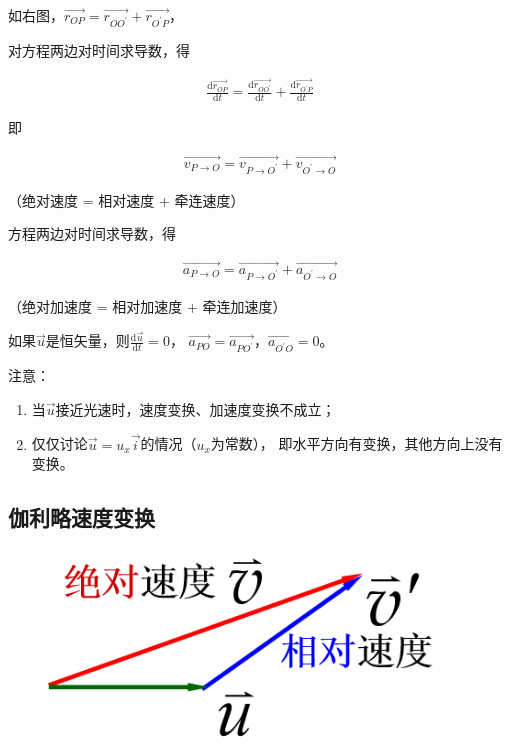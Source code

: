 \documentclass[
	12pt, %
	a4paper, %
]{myLegrandOrangeBook}
\newcommand{\rmd}{\mathrm{d}}
\newcommand{\deriv}[2]{\frac{\rmd #1}{\rmd #2}}
\begin{document}
    如右图，\(\overrightarrow{r_{OP}} = \overrightarrow{r_{OO^{'}}} + \overrightarrow{r_{O^{'}P}}\)，

    对方程两边对时间求导数，得

    \begin{align*}
        \deriv{\overrightarrow{r_{OP}}}{t} = \deriv{\overrightarrow{r_{OO^{'}}}}{t} +
        \deriv{\overrightarrow{r_{O^{'}P}}}{t}
    \end{align*}

    即

    \begin{align}
        \overrightarrow{v_{P \rightarrow O}} = \overrightarrow{v_{P \rightarrow O^{'}}} +
        \overrightarrow{v_{O^{'} \rightarrow O}}
    \end{align}

    （绝对速度 = 相对速度 + 牵连速度）

    方程两边对时间求导数，得

    \begin{align}
        \overrightarrow{a_{P \rightarrow O}} = \overrightarrow{a_{P \rightarrow O^{'}}} +
        \overrightarrow{a_{O^{'} \rightarrow O}}
    \end{align}

    （绝对加速度 = 相对加速度 + 牵连加速度）

    如果\(\overrightarrow{u}\)是恒矢量，则\(\deriv{\overrightarrow{u}}{t} = 0\)，
    \(\overrightarrow{a_{PO}} = \overrightarrow{a_{PO^{'}}}\)，\(\overrightarrow{a_{O^{'}O}} = 0\)。

    注意：

    \begin{enumerate}
        \item 当\(\overrightarrow{u}\)接近光速时，速度变换、加速度变换不成立；
        \item 仅仅讨论\(\overrightarrow{u} = u_x \overrightarrow{i}\)的情况（\(u_x\)为常数），
        即水平方向有变换，其他方向上没有变换。
    \end{enumerate}

\subsection{伽利略速度变换}

    \begin{figure}
        \centering
        \includegraphics[scale=0.4]{"Chapter 01 images/pic9.png"}
        \label{pic9}
    \end{figure}
\end{document}
